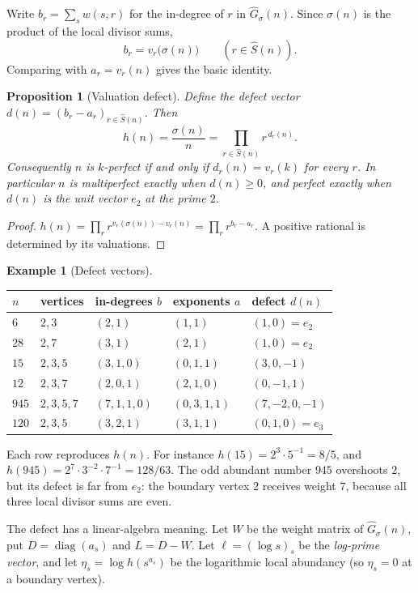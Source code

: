 \documentclass[11pt]{article}
\newtheorem{proposition}[theorem]{Proposition}
\theoremstyle{definition}
\newtheorem{example}[theorem]{Example}
\theoremstyle{remark}
\begin{document}
Write $b_r=\sum_s w(s,r)$ for the in-degree of $r$ in
$\widehat G_\sigma(n)$.  Since $\sigma(n)$ is the product of the local
divisor sums,
\[
b_r=v_r\bigl(\sigma(n)\bigr)\qquad(r\in\widehat S(n)).
\]
Comparing with $a_r=v_r(n)$ gives the basic identity.

\begin{proposition}[Valuation defect]\label{prop:defect}
Define the \emph{defect vector} $d(n)=(b_r-a_r)_{r\in\widehat S(n)}$.  Then
\[
h(n)=\frac{\sigma(n)}{n}=\prod_{r\in\widehat S(n)}r^{\,d_r(n)} .
\]
Consequently $n$ is $k$-perfect if and only if $d_r(n)=v_r(k)$ for every $r$.
In particular $n$ is multiperfect exactly when $d(n)\ge0$, and perfect
exactly when $d(n)$ is the unit vector $e_2$ at the prime $2$.
\end{proposition}

\begin{proof}
$h(n)=\prod_r r^{v_r(\sigma(n))-v_r(n)}=\prod_r r^{b_r-a_r}$.  A positive
rational is determined by its valuations.
\end{proof}

\begin{example}[Defect vectors]\label{ex:defects}
\begin{center}
\begin{tabular}{@{}lllll@{}}
\toprule
$n$ & vertices & in-degrees $b$ & exponents $a$ & defect $d(n)$\\
\midrule
$6$ & $2,3$ & $(2,1)$ & $(1,1)$ & $(1,0)=e_2$\\
$28$ & $2,7$ & $(3,1)$ & $(2,1)$ & $(1,0)=e_2$\\
$15$ & $2,3,5$ & $(3,1,0)$ & $(0,1,1)$ & $(3,0,-1)$\\
$12$ & $2,3,7$ & $(2,0,1)$ & $(2,1,0)$ & $(0,-1,1)$\\
$945$ & $2,3,5,7$ & $(7,1,1,0)$ & $(0,3,1,1)$ & $(7,-2,0,-1)$\\
$120$ & $2,3,5$ & $(3,2,1)$ & $(3,1,1)$ & $(0,1,0)=e_3$\\
\bottomrule
\end{tabular}
\end{center}
Each row reproduces $h(n)$.  For instance $h(15)=2^3\cdot5^{-1}=8/5$, and
$h(945)=2^7\cdot3^{-2}\cdot7^{-1}=128/63$.  The odd abundant number $945$
overshoots $2$, but its defect is far from $e_2$: the boundary vertex $2$
receives weight $7$, because all three local divisor sums are even.
\end{example}

The defect has a linear-algebra meaning.  Let $W$ be the weight matrix of
$\widehat G_\sigma(n)$, put $D=\operatorname{diag}(a_s)$ and $L=D-W$.  Let
$\ell=(\log s)_{s}$ be the \emph{log-prime vector}, and let
$\eta_s=\log h(s^{a_s})$ be the logarithmic local abundancy (so $\eta_s=0$ at
a boundary vertex).
\end{document}
